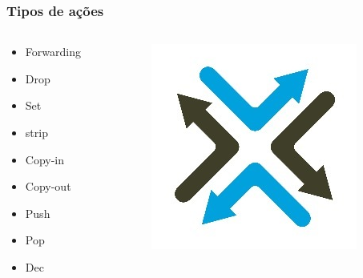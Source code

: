 %
%
\begin{frame}\frametitle{Tipos de ações}

    \begin{columns}[T] %
        \begin{column}{.33\textwidth}

            \begin{itemize}
                \item Forwarding
                \item Drop
                \item Set
                \item strip
                \item Copy-in
                \item Copy-out
                \item Push
                \item Pop
                \item Dec
            \end{itemize}
        \end{column}%
        \hfill%
        \begin{column}{.67\textwidth}
            \begin{figure}[!htb]
                \centering
                \includegraphics[scale=0.5]{images/action-types}
            \end{figure}
        \end{column}%
    \end{columns}

\end{frame}

